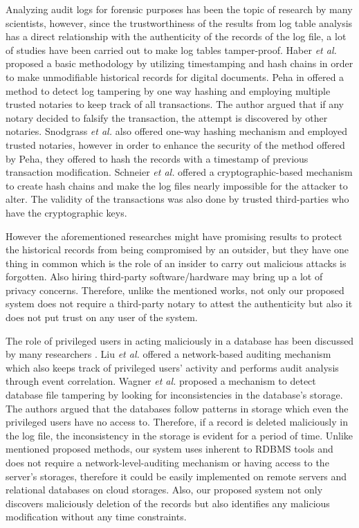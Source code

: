 		Analyzing audit logs for forensic purposes has been the topic of research by many scientists, however, since the trustworthiness of the results from log table analysis has a direct relationship with the authenticity of the records of the log file, a lot of studies have been carried out to make log tables tamper-proof. Haber {\it et al.}\cite{haber1991how} proposed a basic methodology by utilizing timestamping and hash chains in order to make unmodifiable historical records for digital documents. Peha in \cite{peha1999electronic} offered a method to detect log tampering by one way hashing and employing multiple trusted notaries to keep track of all transactions. The author argued that if any notary decided to falsify the transaction, the attempt is discovered by other notaries. Snodgrass {\it et al.} \cite{snodgrass2004Tamper} also offered one-way hashing mechanism and employed trusted notaries, however in order to enhance the security of the method offered by Peha, they offered to hash the records with a timestamp of previous transaction modification. Schneier {\it et al.}\cite{schneier1998cryptoraphic} offered a cryptographic-based mechanism to create hash chains and make the log files nearly impossible for the attacker to alter. The validity of the transactions was also done by trusted third-parties who have the cryptographic keys.

		However the aforementioned researches might have promising results to protect the historical records from being compromised by an outsider, but they have one thing in common which is the role of an insider to carry out malicious attacks is forgotten. Also hiring third-party software/hardware may bring up a lot of privacy concerns. Therefore, unlike the mentioned works, not only our proposed system does not require a third-party notary to attest the authenticity but also it does not put trust on any user of the system.

		The role of privileged users in acting maliciously in a database has been discussed by many researchers \cite{crosby2009tamper-evident} \cite{wagner2018detect}. Liu {\it et al.} offered a network-based auditing mechanism which also keeps track of privileged users' activity and performs audit analysis through event correlation. Wagner {\it et al.} \cite{wanger2017carving} proposed a mechanism to detect database file tampering by looking for inconsistencies in the database's storage. The authors argued that the databases follow patterns in storage which even the privileged users have no access to. Therefore, if a record is deleted maliciously in the log file, the inconsistency in the storage is evident for a period of time. Unlike mentioned proposed methods, our system uses inherent to RDBMS tools and does not require a network-level-auditing mechanism or having access to the server's storages, therefore it could be easily implemented on remote servers and relational databases on cloud storages. Also, our proposed system not only discovers maliciously deletion of the records but also identifies any malicious modification without any time constraints.

